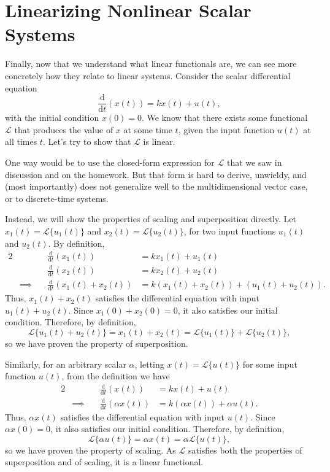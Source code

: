 \documentclass[letterpaper]{article}
\theoremstyle{remark}
\newcommand{\dt}{\mathrm{d}t}
\newcommand{\diff}{\mathrm{d}}
\newcommand{\eqn}[1]{\begin{alignat*}{2}#1\end{alignat*}}
\newcommand*{\thus}{&\implies\quad&}
\begin{document}
\section{Linearizing Nonlinear Scalar Systems}
Finally, now that we understand what linear functionals are, we can see more concretely how they relate to linear systems. Consider the scalar differential equation
\[
    \frac{\diff}{\dt} (x(t)) = kx(t) + u(t),
\]
with the initial condition $x(0) = 0$. We know that there exists some functional $\mathcal{L}$ that produces the value of $x$ at some time $t$, given the input function $u(t)$ at all times $t$. Let's try to show that $\mathcal{L}$ is linear.

One way would be to use the closed-form expression for $\mathcal{L}$ that we saw in discussion and on the homework. But that form is hard to derive, unwieldy, and (most importantly) does not generalize well to the multidimensional vector case, or to discrete-time systems.

Instead, we will show the properties of scaling and superposition directly. Let $x_1(t) = \mathcal{L}\{u_1(t)\}$ and $x_2(t) = \mathcal{L}\{u_2(t)\}$, for two input functions $u_1(t)$ and $u_2(t)$. By definition,
\eqn{
    && \frac{\diff}{\dt} (x_1(t)) &= kx_1(t) + u_1(t) \\
    && \frac{\diff}{\dt} (x_2(t)) &= kx_2(t) + u_2(t) \\
    \thus \frac{\diff}{\dt} (x_1(t) + x_2(t)) &= k(x_1(t) + x_2(t)) + (u_1(t) + u_2(t)).
}
Thus, $x_1(t) + x_2(t)$ satisfies the differential equation with input $u_1(t) + u_2(t)$. Since $x_1(0) + x_2(0) = 0$, it also satisfies our initial condition. Therefore, by definition,
\[
    \mathcal{L}\{u_1(t) + u_2(t)\} = x_1(t) + x_2(t) = \mathcal{L}\{u_1(t)\} + \mathcal{L}\{u_2(t)\},
\]
so we have proven the property of superposition. 

Similarly, for an arbitrary scalar $\alpha$, letting $x(t) = \mathcal{L}\{u(t)\}$ for some input function $u(t)$, from the definition we have
\eqn{
    && \frac{\diff}{\dt} (x(t)) &= kx(t) + u(t) \\
    \thus \frac{\diff}{\dt} (\alpha x(t)) &= k(\alpha x(t)) + \alpha u(t).
}
Thus, $\alpha x(t)$ satisfies the differential equation with input $u(t)$. Since $\alpha x(0) = 0$, it also satisfies our initial condition. Therefore, by definition,
\[
    \mathcal{L}\{\alpha u(t)\} = \alpha x(t) = \alpha\mathcal{L}\{u(t)\},
\]
so we have proven the property of scaling. As $\mathcal{L}$ satisfies both the properties of superposition and of scaling, it is a linear functional.
\end{document}
